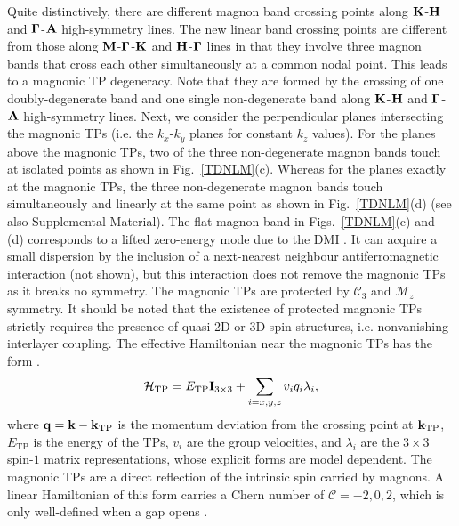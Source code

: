 \documentclass[doublecol]{epl2}
\begin{document}
   Quite distinctively, there are different magnon band crossing points  along ${\bf K}$-${\bf H}$  and  ${\bf \Gamma}$-${\bf A}$ high-symmetry lines. The new linear band crossing points are different from  those along ${\bf M}$-${\bf \Gamma}$-${\bf K}$ and ${\bf H}$-${\bf \Gamma}$ lines in that they involve three magnon bands that cross  each other simultaneously at a common nodal point. This leads to a magnonic TP degeneracy. Note that they  are formed by the crossing of one doubly-degenerate band and one single non-degenerate band along  ${\bf K}$-${\bf H}$  and  ${\bf \Gamma}$-${\bf A}$ high-symmetry lines. Next, we consider the perpendicular planes intersecting the magnonic TPs (i.e. the $k_x$-$k_y$ planes for constant $k_z$ values). For the planes above the magnonic TPs,  two of the three non-degenerate magnon bands  touch at  isolated  points as shown in  Fig.~\ref{TDNLM}(c). Whereas for the planes exactly at the magnonic TPs, the three non-degenerate magnon bands touch simultaneously and linearly at the same point as shown in Fig.~\ref{TDNLM}(d) (see also Supplemental Material).  The flat magnon band in Figs.~\ref{TDNLM}(c) and (d) corresponds to a lifted zero-energy mode due to the DMI \cite{dm3}.  It can  acquire a small dispersion by the inclusion of a next-nearest neighbour antiferromagnetic interaction (not shown), but this interaction does not remove the magnonic TPs as it breaks no symmetry. The magnonic TPs are protected by $\mathcal C_{3}$ and $\mathcal M_{z}$ symmetry.  It should be noted that the existence of protected magnonic TPs strictly requires the presence of  quasi-2D or 3D spin structures, i.e. nonvanishing interlayer coupling.  The effective Hamiltonian near the magnonic TPs has the form \cite{tp1,foot}.
\begin{align}
\mathcal H_{\text{TP}}= E_{\text{TP}}\bold{I}_{3\times 3}+\sum_{i=x,y,z}v_iq_i\lambda_i,
\end{align}
where $\bold{q}=\bold{k}-\bold{k}_{\text{TP}}$ is the momentum deviation from the crossing point at $\bold{k}_{\text{TP}}$, $E_{\text{TP}}$ is the energy of the TPs, $v_i$ are the group velocities, and $\lambda_i$  are the $3\times 3$ spin-$1$  matrix representations, whose explicit forms are model dependent. The magnonic TPs are a direct reflection of the intrinsic spin carried by magnons. A linear Hamiltonian of this form carries a Chern number of $\mathcal C=-2,0,2$, which is only well-defined when a gap opens \cite{foot1, foot2, foot3}.
\end{document}
